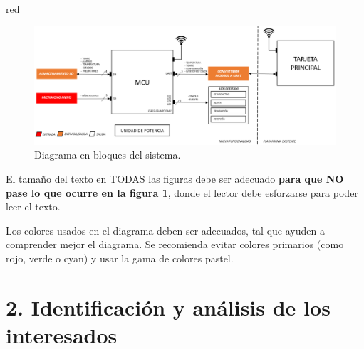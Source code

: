 \documentclass[
11pt, %
]{charter}
\begin{document}
\begin{consigna}{red}
\begin{figure}[htpb]
\centering 
\includegraphics[width=.65\textwidth]{./Figuras/diagramaBloques.png}
\caption{Diagrama en bloques del sistema.}
\label{fig:diagBloques}
\end{figure}

\vspace{25px}

El tamaño del texto en TODAS las figuras debe ser adecuado \textbf{para que NO pase lo que ocurre en la figura \ref{fig:diagBloques}}, donde el lector debe esforzarse para poder leer el texto. 

Los colores usados en el diagrama deben ser adecuados, tal que ayuden a comprender mejor el diagrama. Se recomienda evitar colores primarios (como rojo, verde o cyan) y usar la gama de colores pastel.

\end{consigna} %

\section{2. Identificación y análisis de los interesados}
\label{sec:interesados}
\end{document}
